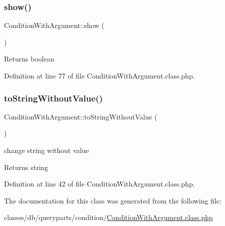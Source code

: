 \subsubsection{\texorpdfstring{show()}{show()}}
{\footnotesize\ttfamily Condition\+With\+Argument\+::show (\begin{DoxyParamCaption}{ }\end{DoxyParamCaption})}

\begin{DoxyReturn}{Returns}
boolean 
\end{DoxyReturn}


Definition at line 77 of file Condition\+With\+Argument.\+class.\+php.

\mbox{\label{classConditionWithArgument_adf2841f219b6bf3b96414c2c6100ce6c}} 
\subsubsection{\texorpdfstring{to\+String\+Without\+Value()}{toStringWithoutValue()}}
{\footnotesize\ttfamily Condition\+With\+Argument\+::to\+String\+Without\+Value (\begin{DoxyParamCaption}{ }\end{DoxyParamCaption})}

change string without value \begin{DoxyReturn}{Returns}
string 
\end{DoxyReturn}


Definition at line 42 of file Condition\+With\+Argument.\+class.\+php.



The documentation for this class was generated from the following file\+:\begin{DoxyCompactItemize}
\item 
classes/db/queryparts/condition/\hyperlink{ConditionWithArgument_8class_8php}{Condition\+With\+Argument.\+class.\+php}\end{DoxyCompactItemize}
